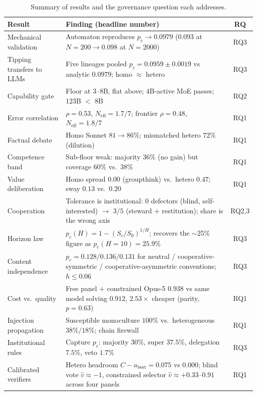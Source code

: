 \documentclass[manuscript,screen,review]{acmart}
\begin{document}
\begin{table}[t]
\caption{Summary of results and the governance question each addresses.}
\label{tab:summary}
\small
\begin{tabular}{@{}p{3.4cm}p{6.2cm}c@{}}
\toprule
\textbf{Result} & \textbf{Finding (headline number)} & \textbf{RQ} \\
\midrule
Mechanical validation & Automaton reproduces $p_c\!\to\!0.0979$ ($0.093$ at $N{=}200 \to 0.098$ at $N{=}2000$) & RQ3 \\
Tipping transfers to LLMs & Five lineages pooled $p_c{=}0.0959\pm0.0019$ vs analytic $0.0979$; homo $\approx$ hetero & RQ3 \\
Capability gate & Floor at $3$--$8$B, flat above; $4$B-active MoE passes; $123$B $<$ $8$B & RQ2 \\
Error correlation & $\rho{=}0.53$, $N_{\mathrm{eff}}{=}1.7/7$; frontier $\rho{=}0.48$, $N_{\mathrm{eff}}{=}1.8/7$ & RQ1 \\
Factual debate & Homo Sonnet $81\!\to\!86\%$; mismatched hetero $72\%$ (dilution) & RQ1 \\
Competence band & Sub-floor weak: majority $36\%$ (no gain) but coverage $60\%$ vs.\ $38\%$ & RQ1 \\
Value deliberation & Homo spread $0.00$ (groupthink) vs.\ hetero $0.47$; sway $0.13$ vs.\ $0.20$ & RQ1 \\
Cooperation & Tolerance is institutional: $0$ defectors (blind, self-interested) $\to$ $3/5$ (steward $+$ restitution); share is the wrong axis & RQ2,3 \\
Horizon law & $p_c(H){=}1{-}(S_c/S_0)^{1/H}$; recovers the $\sim$25\% figure as $p_c(H{=}10){=}25.9\%$ & RQ3 \\
Content independence & $p_c{=}0.128/0.136/0.131$ for neutral / cooperative-symmetric / cooperative-asymmetric conventions; $h{\leq}0.06$ & RQ3 \\
Cost vs.\ quality & Free panel $+$ constrained Opus-5 $0.938$ vs same model solving $0.912$, $2.53\times$ cheaper (parity, $p{=}0.63$) & RQ1 \\
Injection propagation & Susceptible monoculture $100\%$ vs.\ heterogeneous $38\%/18\%$; chain firewall & RQ1 \\
Institutional rules & Capture $p_c$: majority $30\%$, super $37.5\%$, delegation $7.5\%$, veto $1.7\%$ & RQ3 \\
Calibrated verifiers & Hetero headroom $C{-}a_{\mathrm{best}}{=}0.075$ vs $0.000$; blind vote $\hat v{\approx}{-}1$, constrained selector $\hat v{\approx}{+}0.33$--$0.91$ across four panels & RQ1 \\

\end{tabular}
\end{table}
\end{document}
